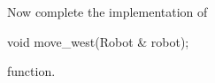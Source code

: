 Now complete the implementation of
{\small
\begin{console}
void move_west(Robot & robot);
\end{console}
}
function.

